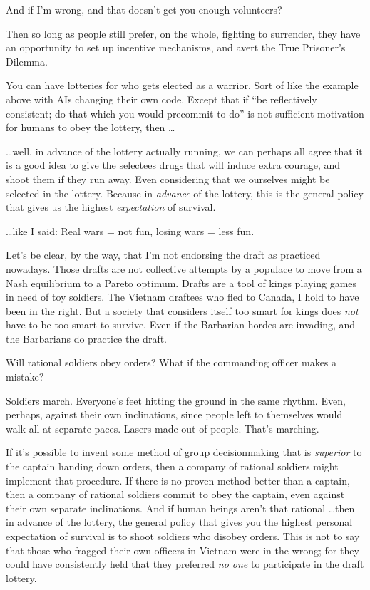 {
 And if I'm wrong, and that doesn't
get you enough volunteers?}

{
 Then so long as people still prefer, on the whole, fighting to
surrender, they have an opportunity to set up incentive mechanisms, and
avert the True Prisoner's Dilemma.}

{
 You can have lotteries for who gets elected as a warrior. Sort of
like the example above with AIs changing their own code. Except that if
``be reflectively consistent; do that which you would
precommit to do'' is not sufficient motivation for
humans to obey the lottery, then \ldots}

{
 \ldots well, in advance of the lottery actually running, we can
perhaps all agree that it is a good idea to give the selectees drugs
that will induce extra courage, and shoot them if they run away. Even
considering that we ourselves might be selected in the lottery. Because
in \textit{advance} of the lottery, this is the general policy that
gives us the highest \textit{expectation} of survival.}

{
 \ldots like I said: Real wars = not fun, losing wars = less fun.}

{
 Let's be clear, by the way, that
I'm not endorsing the draft as practiced nowadays.
Those drafts are not collective attempts by a populace to move from a
Nash equilibrium to a Pareto optimum. Drafts are a tool of kings
playing games in need of toy soldiers. The Vietnam draftees who fled to
Canada, I hold to have been in the right. But a society that considers
itself too smart for kings does \textit{not} have to be too smart to
survive. Even if the Barbarian hordes are invading, and the Barbarians
do practice the draft.}

{
 Will rational soldiers obey orders? What if the commanding officer
makes a mistake?}

{
 Soldiers march. Everyone's feet hitting the ground
in the same rhythm. Even, perhaps, against their own inclinations,
since people left to themselves would walk all at separate paces.
Lasers made out of people. That's marching.}

{
 If it's possible to invent some method of group
decisionmaking that is \textit{superior} to the captain handing down
orders, then a company of rational soldiers might implement that
procedure. If there is no proven method better than a captain, then a
company of rational soldiers commit to obey the captain, even against
their own separate inclinations. And if human beings
aren't that rational \ldots then in advance of the
lottery, the general policy that gives you the highest personal
expectation of survival is to shoot soldiers who disobey orders. This
is not to say that those who fragged their own officers in Vietnam were
in the wrong; for they could have consistently held that they preferred
\textit{no one} to participate in the draft lottery.}

